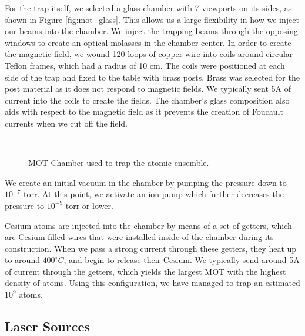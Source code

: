 For the trap itself, we selected a glass chamber with 7 viewports on its
sides, as shown in Figure \ref{fig:mot_glass}.  This allows us a large flexibility in how we inject our beams into the
chamber.  We inject the trapping beams through the opposing windows to create
an optical molasses in the chamber center.  In order to create the magnetic field, we wound 120 loops of copper wire into coils around circular Teflon frames, which had a radius of 10 cm.  The coils were positioned at each side of the trap and fixed to the table with brass posts.  Brass was selected for the post material as it does not respond to magnetic fields.  We typically sent 5A of current into the coils to create the fields.  The chamber's glass composition also aids with respect to the magnetic field as it prevents the creation of Foucault currents when we cut off the field.

\begin{figure}[!ht]
  \centering
   \\
   \caption[Glass MOT chamber]{MOT Chamber used to trap the atomic ensemble.} 
  \label{fig:mot_chamber}
\end{figure}

We create an initial vacuum in the chamber by pumping the pressure down to $10^{-7}$ torr.  At this point, we activate an ion pump which further decreases the pressure to $10^{-9}$ torr or lower.  

Cesium atoms are injected into the chamber by means of a set of getters, which are Cesium filled wires that were installed inside of the chamber during its construction.  When we pass a strong current through these getters, they heat up to around $400^\circ C$, and begin to release their Cesium.  We typically send around 5A of current through the getters, which yields the largest MOT with the highest density of atoms.  Using this configuration, we have managed to trap an estimated $10^9$ atoms.  

\subsection{Laser Sources} 
  
